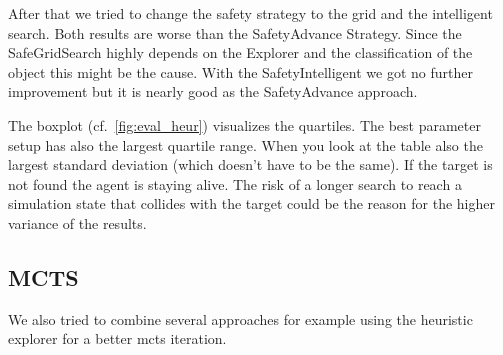 After that we tried to change the safety strategy to the grid and the intelligent search. Both results
are worse than the SafetyAdvance Strategy. Since the SafeGridSearch highly depends on the Explorer and the
classification of the object this might be the cause.
With the SafetyIntelligent we got no further improvement but it is nearly good as the SafetyAdvance approach.

The boxplot (cf.~\cref{fig:eval_heur}) visualizes the quartiles. The best parameter setup has also the largest
quartile range. When you look at the table also the largest standard deviation (which doesn't have to be the same).
If the target is not found the agent is staying alive. The risk of a longer search to reach a simulation state
that collides with the target could be the reason for the higher variance of the results.



\subsection{MCTS} 
We also tried to combine several approaches for example using the heuristic explorer 
for a better \ac{mcts} iteration. 


